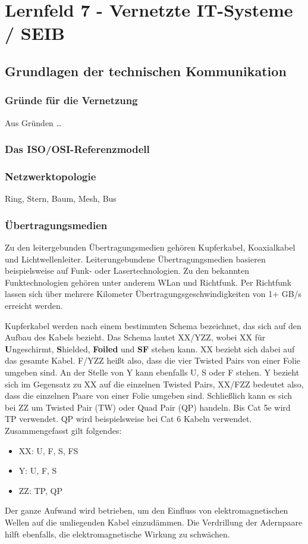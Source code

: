 \section{Lernfeld 7 - Vernetzte IT-Systeme / SEIB} %

\subsection{Grundlagen der technischen Kommunikation}
\subsubsection{Gründe für die Vernetzung}

Aus Gründen \dots

\subsubsection{Das ISO/OSI-Referenzmodell}
\subsubsection{Netzwerktopologie}

Ring, Stern, Baum, Mesh, Bus

\subsubsection{Übertragungsmedien}

Zu den leitergebunden Übertragungsmedien gehören Kupferkabel, Koaxialkabel und Lichtwellenleiter. Leiterungebundene Übertragungsmedien basieren beispielsweise auf Funk- oder Lasertechnologien. Zu den bekannten Funktechnologien gehören unter anderem WLan und Richtfunk. Per Richtfunk lassen sich über mehrere Kilometer Übertragungsgeschwindigkeiten von 1+ GB/s erreicht werden.

Kupferkabel werden nach einem bestimmten Schema bezeichnet, das sich auf den Aufbau des Kabels bezieht. Das Schema lautet XX/YZZ, wobei XX für {\bf U}ngeschirmt, {\bf S}hielded, {\bf Foiled} und {\bf SF} stehen kann. XX bezieht sich dabei auf das gesamte Kabel. F/YZZ heißt also, dass die vier Twisted Pairs von einer Folie umgeben sind. An der Stelle von Y kann ebenfalls U, S oder F stehen. Y bezieht sich im Gegensatz zu XX auf die einzelnen Twisted Pairs, XX/FZZ bedeutet also, dass die einzelnen Paare von einer Folie umgeben sind. Schließlich kann es sich bei ZZ um Twisted Pair (TW) oder Quad Pair (QP) handeln. Bis Cat 5e wird TP verwendet. QP wird beispielsweise bei Cat 6 Kabeln verwendet. Zusammengefasst gilt folgendes: 
\begin{itemize}
	\item XX: U, F, S, FS 
	\item  Y: U, F, S
	\item ZZ: TP, QP
\end{itemize}
Der ganze Aufwand wird betrieben, um den Einfluss von elektromagnetischen Wellen auf die umliegenden Kabel einzudämmen.	 Die Verdrillung der Adernpaare hilft ebenfalls, die elektromagnetische Wirkung zu schwächen.

